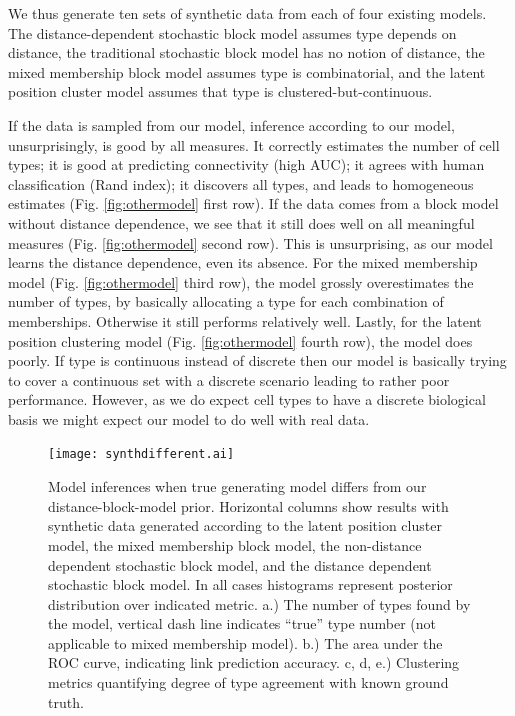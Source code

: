 \documentclass{article}
\begin{document}
{We thus generate ten sets of synthetic data from each of four existing
models.  The distance-dependent stochastic block model assumes type
depends on distance, the traditional stochastic block model has no
notion of distance, the mixed membership block model assumes type is
combinatorial, and the latent position cluster model assumes that type
is clustered-but-continuous.

If the data is sampled from our model, inference according to our
model, unsurprisingly, is good by all measures. It correctly estimates
the number of cell types; it is good at predicting connectivity (high
AUC); it agrees with human classification (Rand index); it discovers
all types, and leads to homogeneous estimates
(Fig. \ref{fig:othermodel} first row). If the data comes from a block
model without distance dependence, we see that it still does well on
all meaningful measures (Fig. \ref{fig:othermodel} second row). This
is unsurprising, as our model learns the distance dependence, even its
absence. For the mixed membership model (Fig. \ref{fig:othermodel}
third row), the model grossly overestimates the number of types, by
basically allocating a type for each combination of
memberships. Otherwise it still performs relatively well. Lastly, for
the latent position clustering model (Fig. \ref{fig:othermodel} fourth
row), the model does poorly. If type is continuous instead of discrete
then our model is basically trying to cover a continuous set with a
discrete scenario leading to rather poor performance. However, as we
do expect cell types to have a discrete biological basis we might
expect our model to do well with real data.

\begin{figure}
  \centering 

  \texttt{[image: synthdifferent.ai]}
  \caption{Model inferences when true generating model differs from our distance-block-model prior. Horizontal columns show results with synthetic data generated according to the latent position cluster model, the mixed membership block model, the non-distance dependent stochastic block model, and the distance dependent stochastic block model. In all cases histograms represent posterior distribution over indicated metric. a.) The number of types found by the model, vertical dash line indicates ``true'' type number (not applicable to mixed membership model). b.) The area under the ROC curve, indicating link prediction accuracy. c, d, e.) Clustering metrics
quantifying degree of type agreement with known ground truth. }


\end{figure}}
\end{document}
